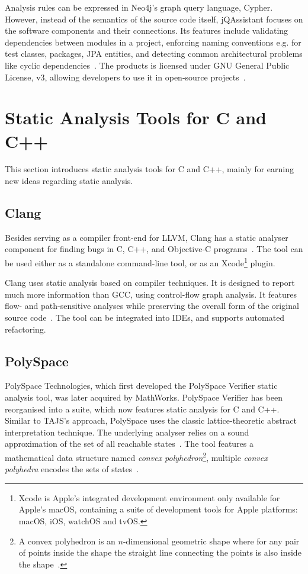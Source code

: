 Analysis rules can be expressed in Neo4j's graph query language, Cypher. However, instead of the semantics of the source code itself, jQAssistant focuses on the software components and their connections. Its features include validating dependencies between modules in a project, enforcing naming conventions e.g. for test classes, packages, JPA entities, and detecting common architectural problems like cyclic dependencies~\cite{jqassistant-documentation}. The products is licensed under GNU General Public License, v3, allowing developers to use it in open-source projects~\cite{gplv3}.


\section{Static Analysis Tools for C and C++}

This section introduces static analysis tools for C and C++, mainly for earning new ideas regarding static analysis.


\subsection{Clang}

Besides serving as a compiler front-end for LLVM, Clang has a static analyser component for finding bugs in C, C++, and Objective-C programs~\cite{clang-analyser-website}. The tool can be used either as a standalone command-line tool, or as an Xcode\footnote{Xcode is Apple's integrated development environment only available for Apple's macOS, containing a suite of development tools for Apple platforms: macOS, iOS, watchOS and tvOS.} plugin.

Clang uses static analysis based on compiler techniques. It is designed to report much more information than GCC, using control-flow graph analysis. It features flow- and path-sensitive analyses while preserving the overall form of the original source code~\cite{kremenek2008finding}. The tool can be integrated into IDEs, and supports automated refactoring.


\subsection{PolySpace}

PolySpace Technologies, which first developed the PolySpace Verifier static analysis tool, was later acquired by MathWorks. PolySpace Verifier has been reorganised into a suite, which now features static analysis for C and C++. Similar to TAJS's approach, PolySpace uses the classic lattice-theoretic abstract interpretation technique. The underlying analyser relies on a sound approximation of the set of all reachable states~\cite{emanuelsson2008comparative}. The tool features a mathematical data structure named \emph{convex polyhedron}\footnote{A convex polyhedron is an $n$-dimensional geometric shape where for any pair of points inside the shape the straight line connecting the points is also inside the shape~\cite{emanuelsson2008comparative}.}, multiple \emph{convex polyhedra} encodes the sets of states~\cite{cousot1978automatic}.

